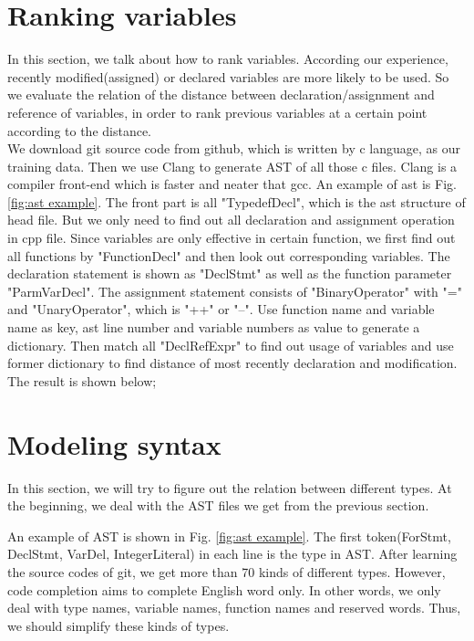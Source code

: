 \documentclass[prodmode,acmtecs]{acmsmall} %
\begin{document}
\section{Ranking variables}
In this section, we talk about how to rank variables. According our experience, recently modified(assigned) or declared variables are more likely to be used. So we evaluate the relation of the distance between declaration/assignment and reference of variables, in order to rank previous variables at a certain point according to the distance. \\
We download git source code from github, which is written by c language, as our training data. Then we use Clang to generate AST of all those c files. Clang is a compiler front-end which is faster and neater that gcc. An example of ast is Fig. \ref{fig:ast example}. The front part is all "TypedefDecl", which is the ast structure of head file. But we only need to find out all declaration and assignment operation in cpp file. Since variables are only effective in certain function, we first find out all functions by "FunctionDecl" and then look out corresponding variables. The declaration statement is shown as "DeclStmt" as well as the function parameter "ParmVarDecl". The assignment statement consists of "BinaryOperator" with "=" and "UnaryOperator", which is "++" or "--". Use function name and variable name as key, ast line number and variable numbers as value to generate a dictionary. Then match all "DeclRefExpr" to find out usage of variables and use former dictionary to find distance of most recently declaration and modification. The result is shown below;

                                                           



\section{Modeling syntax}
In this section, we will try to figure out the relation between different types. At the beginning, we deal with the AST files we get from the previous section. 

An example of AST is shown in Fig. \ref{fig:ast example}. The first token(ForStmt, DeclStmt, VarDel, IntegerLiteral) in each line is the type in AST. After learning the source codes of git\cite{torvalds2010git}, we get more than 70 kinds of different types. However, code completion aims to complete English word only. In other words, we only deal with type names, variable names, function names and reserved words. Thus, we should simplify these kinds of types. 
\end{document}
